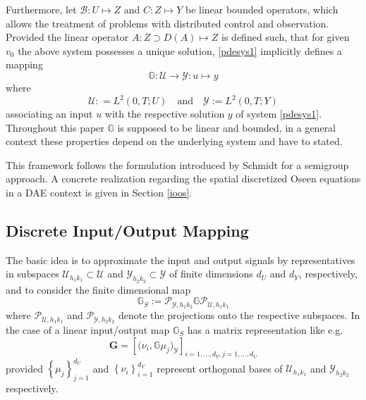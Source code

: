\documentclass[a4paper,10pt,BCOR=15mm]{scrbook}
\providecommand{\andi}[0]{\quad \text{and} \quad}
\begin{document}
Furthermore, let $\mathcal B:U\mapsto Z$ and $C:Z\mapsto Y$ be linear bounded operators, which allows the treatment of problems with distributed control and observation. Provided the linear operator $A:Z\supset D(A) \mapsto Z$ is defined such, that for given $v_0$ the above system possesses a unique solution, \eqref{pdesys1} implicitly defines a mapping
\begin{equation*}
\mathbb G: \mathcal U \rightarrow \mathcal Y:u \mapsto y
\end{equation*}
where
\begin{equation*}
 \mathcal U: = L^2(0,T;U) \andi{} \mathcal Y := L^2(0,T;Y)
\end{equation*}
associating an input $u$ with the respective solution $y$ of system \eqref{pdesys1}. Throughout this paper $\mathbb G$ is supposed to be linear and bounded, in a general context these properties depend on the underlying system and have to stated. 

This framework follows the formulation introduced by Schmidt \cite[p. 30]{schm} for a semigroup approach. A concrete realization regarding the spatial discretized Oseen equations in a DAE context is given in Section \ref{ioos}.


\subsection{Discrete Input/Output Mapping}\label{diom}
The basic idea is to approximate the input and output signals by representatives in subspaces $\mathcal U_{h_1k_1} \subset \mathcal U$ and $\mathcal Y_{h_2k_2} \subset \mathcal Y$ of finite dimensions $d_U$ and $d_Y$, respectively, and to consider the finite dimensional map
\begin{equation*}
 \mathbb G_S := \mathscr P_{\mathcal Y,h_2k_2}\mathbb G\mathscr P_{\mathcal U,h_1k_1}
\end{equation*}
where $\mathscr P_{\mathcal U,h_1k_1}$ and $\mathscr P_{\mathcal Y,h_2k_2}$ denote the projections onto the respective subspaces. In the case of a linear input/output map $\mathbb G_S$ has a matrix representation like e.g. 
\begin{equation*}
 \mathbf G = \left[ \mathbf (\nu_i,\mathbb G \mu_j)_{\mathcal Y} \right ]_{i=1,\dots,d_Y,j=1,\dots,d_U}
\end{equation*}
provided $\left \{ \mu_j \right \}_{ j =1}^{d_U}  $ and $\left \{ \nu_i \right \}_{i =1}^{d_Y}$ represent orthogonal bases of $\mathcal U_{h_1k_1} $ and $\mathcal Y_{h_2k_2}$ respectively. 
\end{document}
